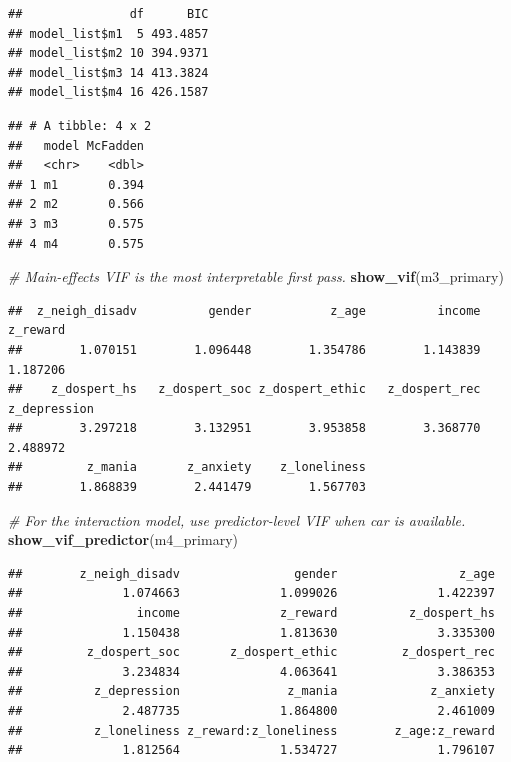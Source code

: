 \documentclass[
]{article}
\newenvironment{Shaded}{\begin{snugshade}}{\end{snugshade}}
\newcommand{\CommentTok}[1]{\textcolor[rgb]{0.56,0.35,0.01}{\textit{#1}}}
\newcommand{\FunctionTok}[1]{\textcolor[rgb]{0.13,0.29,0.53}{\textbf{#1}}}
\newcommand{\NormalTok}[1]{#1}
\newcommand{\SpecialCharTok}[1]{\textcolor[rgb]{0.81,0.36,0.00}{\textbf{#1}}}
\begin{document}
\begin{verbatim}
##               df      BIC
## model_list$m1  5 493.4857
## model_list$m2 10 394.9371
## model_list$m3 14 413.3824
## model_list$m4 16 426.1587
\end{verbatim}

\begin{Shaded}
\end{Shaded}

\begin{verbatim}
## # A tibble: 4 x 2
##   model McFadden
##   <chr>    <dbl>
## 1 m1       0.394
## 2 m2       0.566
## 3 m3       0.575
## 4 m4       0.575
\end{verbatim}

\begin{Shaded}
\begin{Highlighting}[]
\CommentTok{\# Main{-}effects VIF is the most interpretable first pass.}
\FunctionTok{show\_vif}\NormalTok{(m3\_primary)}
\end{Highlighting}
\end{Shaded}

\begin{verbatim}
##  z_neigh_disadv          gender           z_age          income        z_reward 
##        1.070151        1.096448        1.354786        1.143839        1.187206 
##    z_dospert_hs   z_dospert_soc z_dospert_ethic   z_dospert_rec    z_depression 
##        3.297218        3.132951        3.953858        3.368770        2.488972 
##         z_mania       z_anxiety    z_loneliness 
##        1.868839        2.441479        1.567703
\end{verbatim}

\begin{Shaded}
\begin{Highlighting}[]
\CommentTok{\# For the interaction model, use predictor{-}level VIF when car is available.}
\FunctionTok{show\_vif\_predictor}\NormalTok{(m4\_primary)}
\end{Highlighting}
\end{Shaded}

\begin{verbatim}
##        z_neigh_disadv                gender                 z_age 
##              1.074663              1.099026              1.422397 
##                income              z_reward          z_dospert_hs 
##              1.150438              1.813630              3.335300 
##         z_dospert_soc       z_dospert_ethic         z_dospert_rec 
##              3.234834              4.063641              3.386353 
##          z_depression               z_mania             z_anxiety 
##              2.487735              1.864800              2.461009 
##          z_loneliness z_reward:z_loneliness        z_age:z_reward 
##              1.812564              1.534727              1.796107
\end{verbatim}
\end{document}
